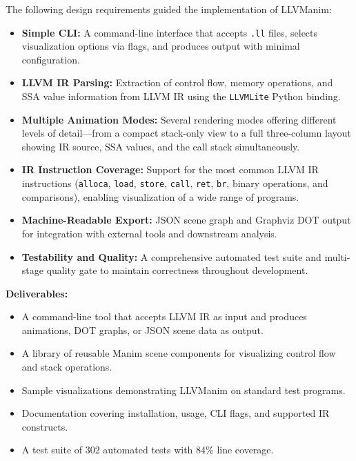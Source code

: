 The following design requirements guided the implementation of LLVManim:

\begin{itemize}
\item \textbf{Simple CLI:} A command-line interface that accepts \texttt{.ll} files, selects visualization options via flags, and produces output with minimal configuration.
\item \textbf{LLVM IR Parsing:} Extraction of control flow, memory operations, and SSA value information from LLVM IR using the \texttt{LLVMLite}\cite{llvmlite} Python binding.
\item \textbf{Multiple Animation Modes:} Several rendering modes offering different levels of detail---from a compact stack-only view to a full three-column layout showing IR source, SSA values, and the call stack simultaneously.
\item \textbf{IR Instruction Coverage:} Support for the most common LLVM IR instructions (\texttt{alloca}, \texttt{load}, \texttt{store}, \texttt{call}, \texttt{ret}, \texttt{br}, binary operations, and comparisons), enabling visualization of a wide range of programs.
\item \textbf{Machine-Readable Export:} JSON scene graph and Graphviz DOT output for integration with external tools and downstream analysis.
\item \textbf{Testability and Quality:} A comprehensive automated test suite and multi-stage quality gate to maintain correctness throughout development.
\end{itemize}
\vspace{1ex}

\textbf{Deliverables:}
\begin{itemize}
  \item A command-line tool that accepts LLVM IR as input and produces animations, DOT graphs, or JSON scene data as output.
  \item A library of reusable Manim scene components for visualizing control flow and stack operations.
  \item Sample visualizations demonstrating LLVManim on standard test programs.
  \item Documentation covering installation, usage, CLI flags, and supported IR constructs.
  \item A test suite of 302 automated tests with 84\% line coverage.
\end{itemize}

